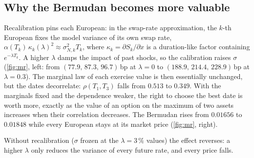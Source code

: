 \documentclass[11pt,a4paper]{article}
\theoremstyle{definition}
\theoremstyle{remark}
\begin{document}
\subsection{Why the Bermudan becomes more valuable}
Recalibration pins each European: in the swap-rate approximation, the $k$-th European fixes the model variance of its own
swap rate, $\alpha(T_k)\,\kappa_k(\lambda)^2\approx\sigma_{N,k}^2T_k$, where $\kappa_k=\partial S_k/\partial x$ is a duration-like
factor containing $e^{-\lambda T_k}$. A higher $\lambda$ damps the impact of past shocks, so the calibration raises
$\sigma$ (\cref{fig:mr}, left: from $(77.9,\,87.3,\,96.7)$\,bp at $\lambda=0$ to $(188.9,\,214.4,\,228.9)$\,bp at $\lambda=0.3$).
The marginal law of each exercise value is then essentially unchanged, but the dates decorrelate:
$\rho(T_1,T_3)$ falls from $0.513$ to $0.349$. With the marginals fixed and the dependence weaker, the right to choose the
best date is worth more, exactly as the value of an option on the maximum of two assets increases when their correlation
decreases. The Bermudan rises from $0.01656$ to $0.01848$ while every European stays at its market price
(\cref{fig:mr}, right).

Without recalibration ($\sigma$ frozen at the $\lambda=3\,\%$ values) the effect reverses: a higher $\lambda$ only reduces the
variance of every future rate, and every price falls.
\end{document}
